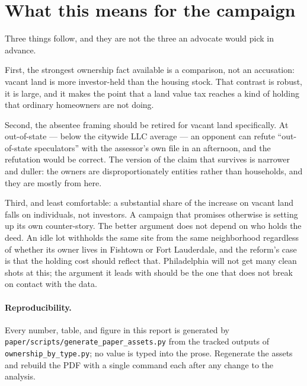 \documentclass[11pt]{article}
\begin{document}
\section{What this means for the campaign}

Three things follow, and they are not the three an advocate would pick in advance.

First, the strongest ownership fact available is a comparison, not an accusation: vacant land
is \PhilOwnVacantVsSfrRatio{} more investor-held than the housing stock. That contrast is
robust, it is large, and it makes the point that a land value tax reaches a kind of holding
that ordinary homeowners are not doing.

Second, the absentee framing should be retired for vacant land specifically. At
\PhilOwnVacantLlcOos{} out-of-state --- below the citywide LLC average --- an opponent can
refute ``out-of-state speculators'' with the assessor's own file in an afternoon, and the
refutation would be correct. The version of the claim that survives is narrower and duller:
the owners are disproportionately entities rather than households, and they are mostly from
here.

Third, and least comfortable: a substantial share of the increase on vacant land falls on
individuals, not investors. A campaign that promises otherwise is setting up its own
counter-story. The better argument does not depend on who holds the deed. An idle lot
withholds the same site from the same neighborhood regardless of whether its owner lives in
Fishtown or Fort Lauderdale, and the reform's case is that the holding cost should reflect
that. Philadelphia will not get many clean shots at this; the argument it leads with should
be the one that does not break on contact with the data.

\paragraph{Reproducibility.} Every number, table, and figure in this report is generated by
\texttt{paper/scripts/generate\_paper\_assets.py} from the tracked outputs of
\texttt{ownership\_by\_type.py}; no value is typed into the prose. Regenerate the assets and
rebuild the PDF with a single command each after any change to the analysis.
\end{document}
